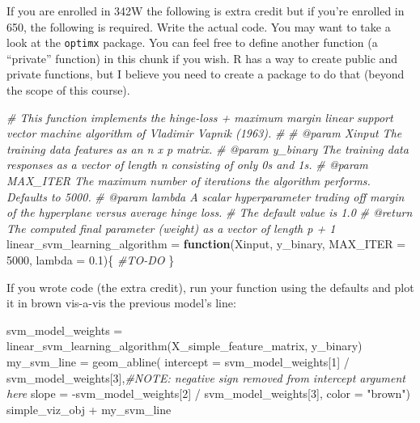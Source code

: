 \documentclass[
]{article}
\newenvironment{Shaded}{\begin{snugshade}}{\end{snugshade}}
\newcommand{\AttributeTok}[1]{\textcolor[rgb]{0.77,0.63,0.00}{#1}}
\newcommand{\CommentTok}[1]{\textcolor[rgb]{0.56,0.35,0.01}{\textit{#1}}}
\newcommand{\ControlFlowTok}[1]{\textcolor[rgb]{0.13,0.29,0.53}{\textbf{#1}}}
\newcommand{\DecValTok}[1]{\textcolor[rgb]{0.00,0.00,0.81}{#1}}
\newcommand{\FloatTok}[1]{\textcolor[rgb]{0.00,0.00,0.81}{#1}}
\newcommand{\FunctionTok}[1]{\textcolor[rgb]{0.00,0.00,0.00}{#1}}
\newcommand{\NormalTok}[1]{#1}
\newcommand{\OtherTok}[1]{\textcolor[rgb]{0.56,0.35,0.01}{#1}}
\newcommand{\SpecialCharTok}[1]{\textcolor[rgb]{0.00,0.00,0.00}{#1}}
\newcommand{\StringTok}[1]{\textcolor[rgb]{0.31,0.60,0.02}{#1}}
\begin{document}
If you are enrolled in 342W the following is extra credit but if you're
enrolled in 650, the following is required. Write the actual code. You
may want to take a look at the \texttt{optimx} package. You can feel
free to define another function (a ``private'' function) in this chunk
if you wish. R has a way to create public and private functions, but I
believe you need to create a package to do that (beyond the scope of
this course).

\begin{Shaded}
\begin{Highlighting}[]
\CommentTok{\#\textquotesingle{} This function implements the hinge{-}loss + maximum margin linear support vector machine algorithm of Vladimir Vapnik (1963).}
\CommentTok{\#\textquotesingle{}}
\CommentTok{\#\textquotesingle{} @param Xinput      The training data features as an n x p matrix.}
\CommentTok{\#\textquotesingle{} @param y\_binary    The training data responses as a vector of length n consisting of only 0\textquotesingle{}s and 1\textquotesingle{}s.}
\CommentTok{\#\textquotesingle{} @param MAX\_ITER    The maximum number of iterations the algorithm performs. Defaults to 5000.}
\CommentTok{\#\textquotesingle{} @param lambda      A scalar hyperparameter trading off margin of the hyperplane versus average hinge loss.}
\CommentTok{\#\textquotesingle{}                    The default value is 1.0}
\CommentTok{\#\textquotesingle{} @return            The computed final parameter (weight) as a vector of length p + 1}
\NormalTok{linear\_svm\_learning\_algorithm }\OtherTok{=} \ControlFlowTok{function}\NormalTok{(Xinput, y\_binary, }\AttributeTok{MAX\_ITER =} \DecValTok{5000}\NormalTok{, }\AttributeTok{lambda =} \FloatTok{0.1}\NormalTok{)\{}
  \CommentTok{\#TO{-}DO}
\NormalTok{\}}
\end{Highlighting}
\end{Shaded}

If you wrote code (the extra credit), run your function using the
defaults and plot it in brown vis-a-vis the previous model's line:

\begin{Shaded}
\begin{Highlighting}[]
\NormalTok{svm\_model\_weights }\OtherTok{=} \FunctionTok{linear\_svm\_learning\_algorithm}\NormalTok{(X\_simple\_feature\_matrix, y\_binary)}
\NormalTok{my\_svm\_line }\OtherTok{=} \FunctionTok{geom\_abline}\NormalTok{(}
    \AttributeTok{intercept =}\NormalTok{ svm\_model\_weights[}\DecValTok{1}\NormalTok{] }\SpecialCharTok{/}\NormalTok{ svm\_model\_weights[}\DecValTok{3}\NormalTok{],}\CommentTok{\#NOTE: negative sign removed from intercept argument here}
    \AttributeTok{slope =} \SpecialCharTok{{-}}\NormalTok{svm\_model\_weights[}\DecValTok{2}\NormalTok{] }\SpecialCharTok{/}\NormalTok{ svm\_model\_weights[}\DecValTok{3}\NormalTok{], }
    \AttributeTok{color =} \StringTok{"brown"}\NormalTok{)}
\NormalTok{simple\_viz\_obj  }\SpecialCharTok{+}\NormalTok{ my\_svm\_line}
\end{Highlighting}
\end{Shaded}
\end{document}
